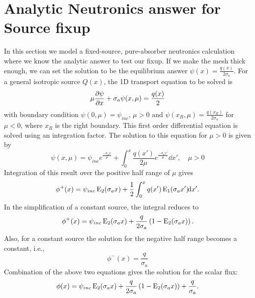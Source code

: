 \section{Analytic Neutronics answer for Source fixup}

In this section we model a fixed-source, pure-absorber neutronics calculation where we know the
analytic answer to test our fixup.  If we make the mesh thick enough, we can set the
solution to be the equilibrium answer $\psi(x) = \frac{q(x)}{2\sigma_a}$. For a general
isotropic source $Q(x)$, the 1D transport equation to be solved is
\begin{equation}
    \mu \frac{\partial \psi}{\partial x} + \sigma_a \psi(x,\mu) = \frac{q(x)}{2}
\end{equation}
with boundary condition $\psi(0,\mu)=\psi_{inc}$, $\mu>0$ and
$\psi(x_R,\mu)=\frac{q(x_R)}{2\sigma_a}$ for
$\mu<0$, where $x_R$ is the right boundary.  
This first order differential equation is solved using an integration factor.
The solution to this equation for $\mu>0$ is given by
\begin{equation}
    \psi(x,\mu) = \psi_{inc}e^{\frac{-\sigma_a x}{\mu}} + \int_0^x \frac{q(x')}{2\mu}
    e^{\frac{-\sigma_a x'}{\mu}} \dd x',\quad \mu>0
\end{equation}
Integration of this result over the positive half range of $\mu$ gives
\begin{equation}
    \phi^+(x) = \psi_{inc}\operatorname{E}_{2}(\sigma_a x) + \frac{1}{2}\int_0^x q(x')\operatorname{E}_{1}(\sigma_a x')
    \!\mathrm{d} x'.
\end{equation}
In the simplification of a constant source, the integral reduces to
\begin{equation}
    \phi^+(x) = \psi_{inc}\operatorname{E}_{2}(\sigma_a x) + \frac{q}{2\sigma_a} \left(1 -
    \operatorname{E}_{2}(\sigma_ax)\right).
\end{equation}
Also, for a constant source the solution for the negative half range becomes a constant, i.e.,
\begin{equation}
    \phi^{-}(x) = \frac{q}{\sigma_a}
\end{equation}
Combination of the above two equations gives the solution for the scalar flux:
\begin{equation}
    \phi(x) = \psi_{inc}\operatorname{E}_{2}(\sigma_a x) + \frac{q}{2\sigma_a} \left(1 -
    \operatorname{E}_{2}(\sigma_ax)\right) + \frac{q}{\sigma_a}.
\end{equation}

